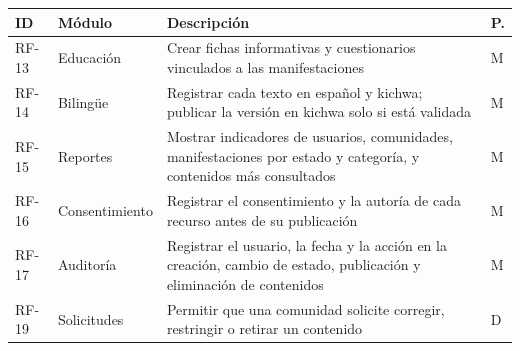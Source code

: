 {\centering\singlespacing
  \label{tab:rf_web2}
  \begin{tabular}{|p{}|p{}|p{}|p{}|}
    \hline
    \textbf{ID} & \textbf{Módulo} & \textbf{Descripción} & \textbf{P.} \tabularnewline
    \hline
    \raggedright\hspace{0pt}RF-13 & \raggedright\hspace{0pt}Educación & \raggedright\hspace{0pt}Crear fichas informativas y cuestionarios vinculados a las manifestaciones & \raggedright\hspace{0pt}M \tabularnewline
    \hline
    \raggedright\hspace{0pt}RF-14 & \raggedright\hspace{0pt}Bilingüe & \raggedright\hspace{0pt}Registrar cada texto en español y kichwa; publicar la versión en kichwa solo si está validada & \raggedright\hspace{0pt}M \tabularnewline
    \hline
    \raggedright\hspace{0pt}RF-15 & \raggedright\hspace{0pt}Reportes & \raggedright\hspace{0pt}Mostrar indicadores de usuarios, comunidades, manifestaciones por estado y categoría, y contenidos más consultados & \raggedright\hspace{0pt}M \tabularnewline
    \hline
    \raggedright\hspace{0pt}RF-16 & \raggedright\hspace{0pt}Consentimiento & \raggedright\hspace{0pt}Registrar el consentimiento y la autoría de cada recurso antes de su publicación & \raggedright\hspace{0pt}M \tabularnewline
    \hline
    \raggedright\hspace{0pt}RF-17 & \raggedright\hspace{0pt}Auditoría & \raggedright\hspace{0pt}Registrar el usuario, la fecha y la acción en la creación, cambio de estado, publicación y eliminación de contenidos & \raggedright\hspace{0pt}M \tabularnewline
    \hline
    \raggedright\hspace{0pt}RF-19 & \raggedright\hspace{0pt}Solicitudes & \raggedright\hspace{0pt}Permitir que una comunidad solicite corregir, restringir o retirar un contenido & \raggedright\hspace{0pt}D \tabularnewline
    \hline
  \end{tabular}\par}


